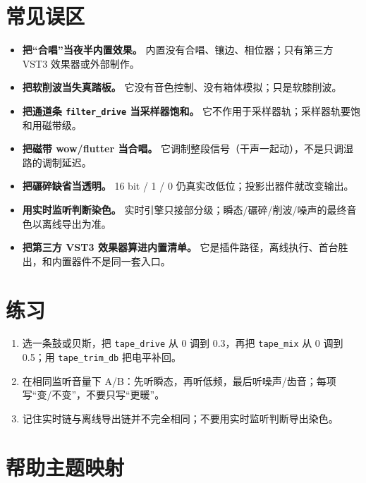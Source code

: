 

\section{常见误区}

\begin{itemize}
  \item \textbf{把“合唱”当夜半内置效果。} 内置没有合唱、镶边、相位器；只有第三方 VST3 效果器或外部制作。
  \item \textbf{把软削波当失真踏板。} 它没有音色控制、没有箱体模拟；只是软膝削波。
  \item \textbf{把通道条 \texttt{filter\_drive} 当采样器饱和。} 它不作用于采样器轨；采样器轨要饱和用磁带级。
  \item \textbf{把磁带 wow/flutter 当合唱。} 它调制整段信号（干声一起动），不是只调湿路的调制延迟。
  \item \textbf{把碾碎缺省当透明。} 16 bit / 1 / 0 仍真实改低位；投影出器件就改变输出。
  \item \textbf{用实时监听判断染色。} 实时引擎只接部分级；瞬态/碾碎/削波/噪声的最终音色以离线导出为准。
  \item \textbf{把第三方 VST3 效果器算进内置清单。} 它是插件路径，离线执行、首台胜出，和内置器件不是同一套入口。
\end{itemize}

\section{练习}


\begin{exercise}
\begin{enumerate}
  \item 选一条鼓或贝斯，把 \texttt{tape\_drive} 从 0 调到 0.3，再把 \texttt{tape\_mix} 从 0 调到 0.5；用 \texttt{tape\_trim\_db} 把电平补回。
  \item 在相同监听音量下 A/B：先听瞬态，再听低频，最后听噪声/齿音；每项写“变/不变”，不要只写“更暖”。
  \item 记住实时链与离线导出链并不完全相同；不要用实时监听判断导出染色。
\end{enumerate}
\end{exercise}

\section{帮助主题映射}

